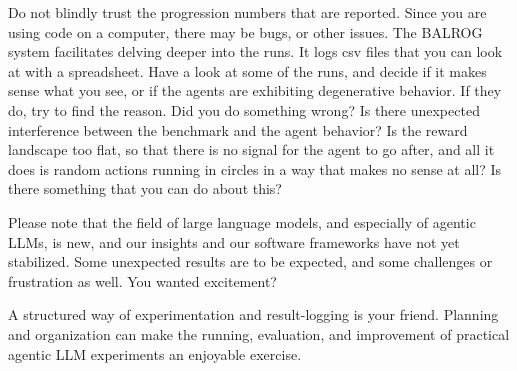 \documentclass[a4]{article}
\begin{document}
Do not blindly trust the progression numbers that are reported. Since you are using code on a computer, there may be bugs, or other issues. The BALROG system facilitates delving deeper into the runs. It logs csv files that you can look at with a spreadsheet. Have a look at some of the runs, and decide if it makes sense what you see, or if the agents are exhibiting degenerative behavior. If they do, try to find the reason. Did you do something wrong? Is there unexpected interference between the benchmark and the agent behavior?
Is the reward landscape too flat, so that there is no signal for the agent to go after, and all it does is random actions running in circles in a way that makes no sense at all? Is there something that you can do about this?

Please note that the field of large language models, and especially of agentic LLMs, is new, and our insights and our software frameworks have not yet stabilized. Some unexpected results are to be expected, and some challenges or frustration as well. You wanted excitement?

A structured way of experimentation and result-logging is your friend. Planning and organization can make the running, evaluation, and improvement of practical agentic LLM experiments an enjoyable exercise. 




%


\end{document}
